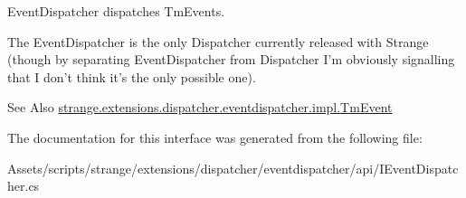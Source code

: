 Event\-Dispatcher dispatches Tm\-Events.

The Event\-Dispatcher is the only Dispatcher currently released with Strange (though by separating Event\-Dispatcher from Dispatcher I'm obviously signalling that I don't think it's the only possible one).

\begin{DoxySeeAlso}{See Also}
\hyperlink{classstrange_1_1extensions_1_1dispatcher_1_1eventdispatcher_1_1impl_1_1_tm_event}{strange.\-extensions.\-dispatcher.\-eventdispatcher.\-impl.\-Tm\-Event} 
\end{DoxySeeAlso}


The documentation for this interface was generated from the following file\-:\begin{DoxyCompactItemize}
\item 
Assets/scripts/strange/extensions/dispatcher/eventdispatcher/api/I\-Event\-Dispatcher.\-cs\end{DoxyCompactItemize}
